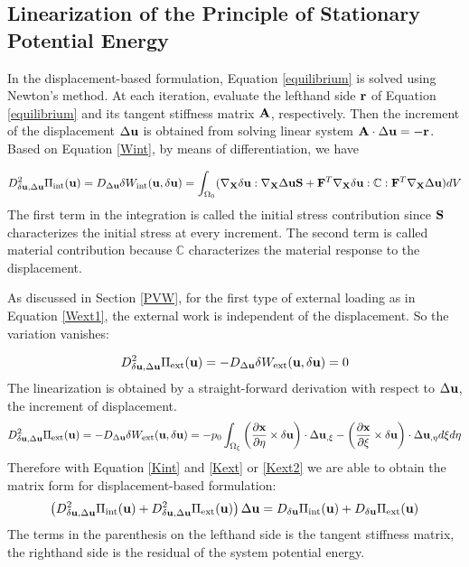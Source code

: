 %
\subsection{Linearization of the Principle of Stationary Potential Energy}
In the displacement-based formulation, Equation \ref{equilibrium} is solved using Newton's method. At each iteration, evaluate the lefthand side $\bold{r}$ of Equation \ref{equilibrium} and its tangent stiffness matrix $\bold{A}$, respectively. Then the increment of the displacement $\Delta\bold{u}$ is obtained from solving linear system $\bold{A} \cdot \Delta\bold{u} = -\bold{r}$. Based on Equation \ref{Wint}, by means of differentiation, we have

\begin{equation} \label{Kint}
D^2_{\delta\bold{u}, \Delta\bold{u}}\Pi_\mathrm{int}(\bold{u}) = D_{\Delta{\bold{u}}}\delta{W_\mathrm{int}}(\bold{u}, \delta{\bold{u}}) = \int_{\Omega_0}(\nabla_{\bold{X}}\delta\bold{u} : \nabla_{\bold{X}}\Delta\bold{u}\bold{S} + \bold{F}^T\nabla_{\bold{X}}\delta{\bold{u}} : \mathbb{C} : \bold{F}^T \nabla_{\bold{X}}\Delta\bold{u})dV
\end{equation}
The first term in the integration is called the initial stress contribution since $\bold{S}$ characterizes the initial stress at every increment. The second term is called material contribution because $\mathbb{C}$ characterizes the material response to the displacement.

As discussed in Section \ref{PVW}, for the first type of external loading as in Equation \ref{Wext1}, the external work is independent of the displacement. So the variation vanishes:

\begin{equation} \label{Kext}
D^2_{\delta\bold{u}, \Delta\bold{u}}\Pi_\mathrm{ext}(\bold{u}) = - D_{\Delta{\bold{u}}}\delta{W_\mathrm{ext}}(\bold{u}, \delta{\bold{u}}) = 0
\end{equation}
The linearization is obtained by a straight-forward derivation with respect to $\Delta\bold{u}$, the increment of displacement. 
\begin{equation}  \label{Kext2}
D^2_{\delta\bold{u}, \Delta\bold{u}}\Pi_\mathrm{ext}(\bold{u}) = - D_{\Delta{\bold{u}}}\delta{W_\mathrm{ext}}(\bold{u}, \delta{\bold{u}}) = - p_0\int_{\Omega_{\xi}}  \left(\frac{\partial{\bold{x}}}{\partial{\eta}} \times \delta\bold{u}\right) \cdot\Delta{\bold{u}}_{,\xi} - 
\left(\frac{\partial{\bold{x}}}{\partial{\xi}} \times \delta\bold{u}\right) \cdot\Delta{\bold{u}}_{,\eta} d\xi{d\eta}
\end{equation}
Therefore with Equation \ref{Kint} and \ref{Kext} or \ref{Kext2} we are able to obtain the matrix form for displacement-based formulation:
\begin{equation} \label{matrix}
\left( D^2_{\delta\bold{u}, \Delta\bold{u}}\Pi_\mathrm{int}(\bold{u}) + D^2_{\delta\bold{u}, \Delta\bold{u}}\Pi_\mathrm{ext}(\bold{u})  \right) \Delta\bold{u} = D_{\delta\bold{u}}\Pi_\mathrm{int}(\bold{u}) + D_{\delta\bold{u}}\Pi_\mathrm{ext}(\bold{u})
\end{equation}
The terms in the parenthesis on the lefthand side is the tangent stiffness matrix, the righthand side is the residual of the system potential energy.

